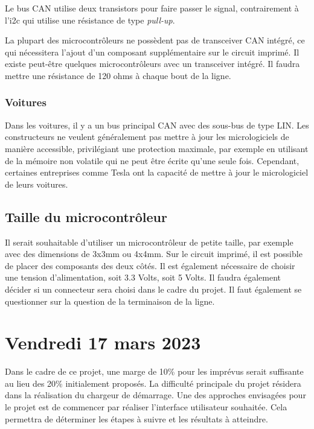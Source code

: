 Le bus CAN utilise deux transistors pour faire passer le signal, contrairement à l'\gls{i2c} qui utilise une résistance de type \textit{pull-up}.

La plupart des microcontrôleurs ne possèdent pas de transceiver CAN intégré, ce qui nécessitera l'ajout d'un composant supplémentaire sur le circuit imprimé.
Il existe peut-être quelques microcontrôleurs avec un transceiver intégré.
Il faudra mettre une résistance de 120 ohms à chaque bout de la ligne.

\subsubsection{Voitures}

Dans les voitures, il y a un bus principal CAN avec des sous-bus de type LIN.
Les constructeurs ne veulent généralement pas mettre à jour les micrologiciels de manière accessible, privilégiant une protection maximale, par exemple en utilisant de la mémoire non volatile qui ne peut être écrite qu'une seule fois.
Cependant, certaines entreprises comme Tesla ont la capacité de mettre à jour le micrologiciel de leurs voitures.

\subsection{Taille du microcontrôleur}

Il serait souhaitable d'utiliser un microcontrôleur de petite taille, par exemple avec des dimensions de 3x3mm ou 4x4mm.
Sur le circuit imprimé, il est possible de placer des composants des deux côtés.
Il est également nécessaire de choisir une tension d'alimentation, soit 3.3 Volts, soit 5 Volts.
Il faudra également décider si un connecteur sera choisi dans le cadre du projet.
Il faut également se questionner sur la question de la terminaison de la ligne.

\section{Vendredi 17 mars 2023}

Dans le cadre de ce projet, une marge de 10\% pour les imprévus serait suffisante au lieu des 20\% initialement proposés.
La difficulté principale du projet résidera dans la réalisation du chargeur de démarrage. Une des approches envisagées pour le projet est de commencer par réaliser l'interface utilisateur souhaitée.
Cela permettra de déterminer les étapes à suivre et les résultats à atteindre.

